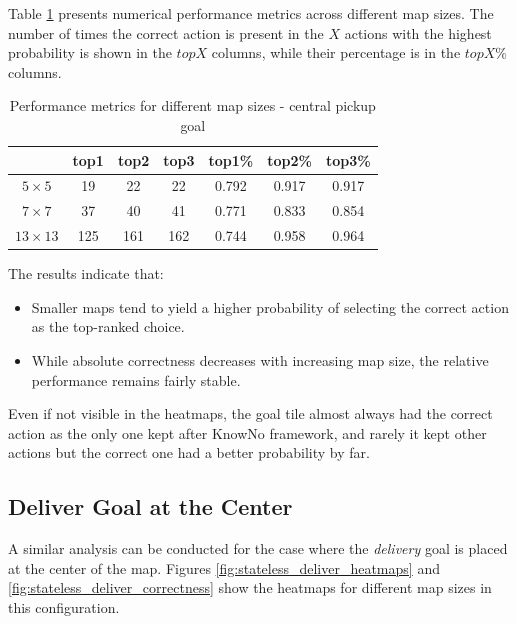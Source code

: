 Table \ref{tab:performance} presents numerical performance metrics across
different map sizes. The number of times the correct action is present in the $X$
actions with the highest probability is shown in the $topX$ columns, while their
percentage is in the $topX\%$ columns.

\vspace{5mm}
\begin{table}[h]
  \centering
  \begin{tabular}{c|ccc|ccc}
                   & top1 & top2 & top3 & top1\% & top2\% & top3\% \\
    \hline
    $5 \times 5$   & 19   & 22   & 22   & 0.792  & 0.917  & 0.917  \\
    $7 \times 7$   & 37   & 40   & 41   & 0.771  & 0.833  & 0.854  \\
    $13 \times 13$ & 125  & 161  & 162  & 0.744  & 0.958  & 0.964  \\
  \end{tabular}
  \caption{Performance metrics for different map sizes - central pickup goal}
  \label{tab:performance}
\end{table}
\vspace{5mm}

The results indicate that:
\begin{itemize}
  \item Smaller maps tend to yield a higher probability of selecting the correct
    action as the top-ranked choice.

  \item While absolute correctness decreases with increasing map size, the
    relative performance remains fairly stable.
\end{itemize}

Even if not visible in the heatmaps, the goal tile almost always had the correct
action as the only one kept after KnowNo framework, and rarely it kept other actions
but the correct one had a better probability by far.

\subsection{Deliver Goal at the Center}

A similar analysis can be conducted for the case where the \emph{delivery} goal is
placed at the center of the map. Figures \ref{fig:stateless_deliver_heatmaps}
and \ref{fig:stateless_deliver_correctness} show the heatmaps for different map
sizes in this configuration.

